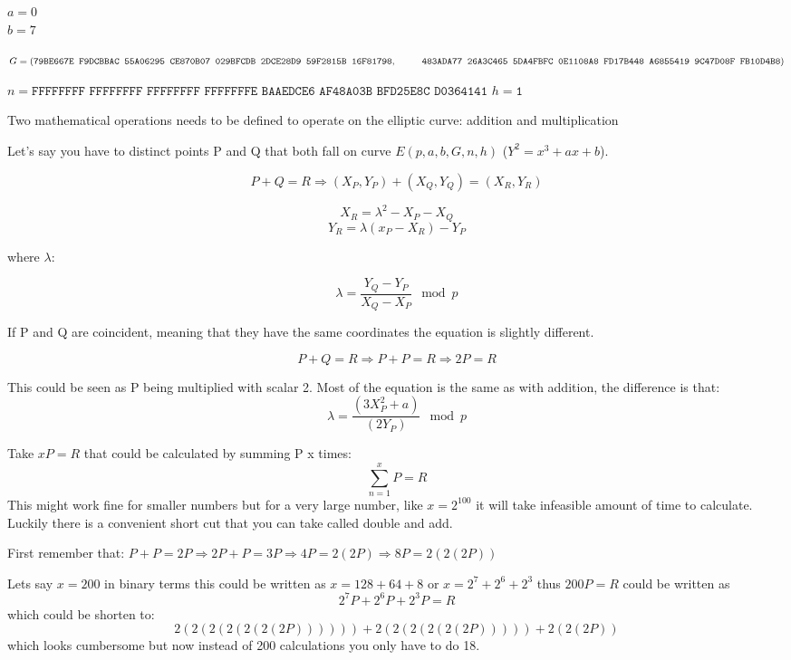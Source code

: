 $a=0$\\
$b=7$

$G=(\texttt{79BE667E F9DCBBAC 55A06295 CE870B07 029BFCDB 2DCE28D9 59F2815B 16F81798},\\ \null\qquad\:\:\: \texttt{483ADA77 26A3C465 5DA4FBFC 0E1108A8 FD17B448 A6855419 9C47D08F FB10D4B8})$


$n=\texttt{FFFFFFFF FFFFFFFF FFFFFFFF FFFFFFFE BAAEDCE6 AF48A03B BFD25E8C D0364141}$
$h=\texttt{1}$

Two mathematical operations needs to be defined to operate on the elliptic curve: addition and multiplication

Let's say you have to distinct points P and Q that both fall on curve $E(p,a,b,G,n,h)$ ($Y^2=x^3+ax+b$). 

$$P+Q=R \Rightarrow (X_P, Y_P) + (X_Q, Y_Q) = (X_R, Y_R)$$

$$X_R = \lambda^2-X_P-X_Q$$
$$Y_R = \lambda(x_P-X_R) -Y_P$$

where $\lambda$:

$$\lambda = \frac{Y_Q-Y_P}{X_Q - X_P} \mod p$$

If P and Q are coincident, meaning that they have the same coordinates the equation is slightly different. 

$$P+Q=R \Rightarrow P+P=R \Rightarrow 2P=R$$ 

This could be seen as P being multiplied with scalar 2. Most of the equation is the same as with addition, the difference is that:\\
$$\lambda = \frac{(3X^2_P + a)}{(2Y_P)} \mod p$$

Take $xP=R$ that could be calculated by summing P x times:
$$\sum_{n=1}^{x} P = R$$
This might work fine for smaller numbers but for a very large number, like $x=2^{100}$ it will take infeasible amount of time to calculate. Luckily there is a convenient short cut that you can take called double and add. 

First remember that: $P+P = 2P \Rightarrow 2P + P = 3P \Rightarrow 4P = 2(2P) \Rightarrow 8P = 2(2(2P))$

Lets say $x=200$ in binary terms this could be written as $x=128+64+8$ or $x=2^7+2^6+2^3$ thus $200P=R$ could be written as $$2^7P+2^6P+2^3P=R$$ which could be shorten to: $$2(2(2(2(2(2(2P)))))) + 2(2(2(2(2(2P))))) + 2(2(2P))$$ which looks cumbersome but now instead of 200 calculations you only have to do 18.


